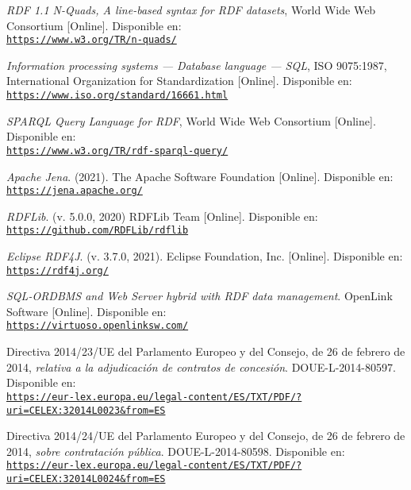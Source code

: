 \begin{thebibliography}{X}
            \textit{RDF 1.1 N-Quads, A line-based syntax for RDF datasets}, World Wide Web Consortium [Online]. Disponible en:
            \\ \texttt{\url{https://www.w3.org/TR/n-quads/}}
            
            \textit{Information processing systems — Database language — SQL}, ISO 9075:1987, International Organization for Standardization [Online]. Disponible en:
            \\ \texttt{\url{https://www.iso.org/standard/16661.html}}
            
            \textit{SPARQL Query Language for RDF}, World Wide Web Consortium [Online]. Disponible en:
            \\ \texttt{\url{https://www.w3.org/TR/rdf-sparql-query/}}
            
        	\textit{Apache Jena}. (2021). The Apache Software Foundation [Online]. Disponible en:
            \\ \texttt{\url{https://jena.apache.org/}}
            
          \textit{RDFLib}. (v. 5.0.0, 2020) RDFLib Team [Online]. Disponible en:
            \\ \texttt{\url{https://github.com/RDFLib/rdflib}}
            
         \textit{Eclipse RDF4J}. (v. 3.7.0, 2021). Eclipse Foundation, Inc. [Online]. Disponible en:
            \\ \texttt{\url{https://rdf4j.org/}}
            
           	\textit{SQL-ORDBMS and Web Server hybrid with RDF data management}. OpenLink Software [Online]. Disponible en:
            \\ \texttt{\url{https://virtuoso.openlinksw.com/}}
            
           Directiva 2014/23/UE del Parlamento Europeo y del Consejo, de 26 de febrero de 2014, \textit{relativa a la adjudicación de contratos de concesión}. DOUE-L-2014-80597. Disponible en:
            \\ \texttt{\url{https://eur-lex.europa.eu/legal-content/ES/TXT/PDF/?uri=CELEX:32014L0023&from=ES}}
            
            Directiva 2014/24/UE del Parlamento Europeo y del Consejo, de 26 de febrero de 2014, \textit{sobre contratación pública}. DOUE-L-2014-80598. Disponible en:
            \\ \texttt{\url{https://eur-lex.europa.eu/legal-content/ES/TXT/PDF/?uri=CELEX:32014L0024&from=ES}}
            

\end{thebibliography}
